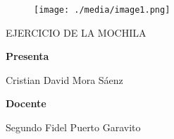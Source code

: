 \documentclass[12pt]{article}
\renewcommand{\_}{\kern-1.5pt\textunderscore\kern-1.5pt}
\begin{document}
\vspace{\baselineskip}



\begin{figure}[H]
	\begin{Center}
		\texttt{[image: ./media/image1.png]}
	\end{Center}
\end{figure}



\par

\begin{Center}
EJERCICIO DE LA MOCHILA
\end{Center}\par

\begin{Center}
\textbf{Presenta}
\end{Center}\par

\begin{Center}
Cristian David Mora Sáenz
\end{Center}\par

\begin{Center}
 
\end{Center}\par

\begin{Center}
 
\end{Center}\par

\begin{Center}
\textbf{Docente }
\end{Center}\par

\begin{Center}
Segundo Fidel Puerto Garavito
\end{Center}\par

\begin{Center}
 
\end{Center}\par

\begin{Center}
 
\end{Center}\par
\end{document}
